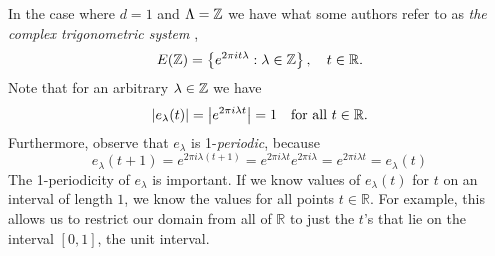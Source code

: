 \documentclass[../thesis.tex]{subfiles}
\begin{document}
\begin{example}
    In the case where $d=1$ and $\Lambda = \mathbb{Z}$ we have what some authors refer to as \emph{the complex trigonometric system} \cite{heilMetricsNormsInner2018} \cite{encyclopediaofmathematicsTrigonometricSystem},
    \begin{align}
        E(\mathbb{Z}) &= \left\{e^{2\pi i t \lambda} : \lambda \in \mathbb{Z}\right\}, \quad t\in \mathbb{R}.\\
    \end{align}
    Note that for an arbitrary $\lambda \in \mathbb{Z}$ we have
    \begin{equation}
        \left|e_{\lambda}(t) \right|= \left|e^{2 \pi i \lambda t}\right| = 1 \quad \text{for all } t\in \mathbb{R}.
    \end{equation}
    Furthermore, observe that $e_\lambda$ is 1-\emph{periodic}, because
    \begin{equation}
        e_\lambda(t+1) = e^{2 \pi i \lambda (t+1)} = e^{2 \pi i \lambda t} e^{2 \pi i \lambda} = e^{2 \pi i \lambda t} = e_\lambda(t)
    \end{equation}
    The 1-periodicity of $e_\lambda$ is important. If we know values of $e_\lambda(t)$ for $t$ on an interval of length $1$, we know the values for all points $t\in \mathbb{R}$. For example, this allows us to restrict our domain from all of $\mathbb{R}$ to just the $t$'s that lie on the interval $[0,1]$, the unit interval. 
\end{example}

\end{document}
